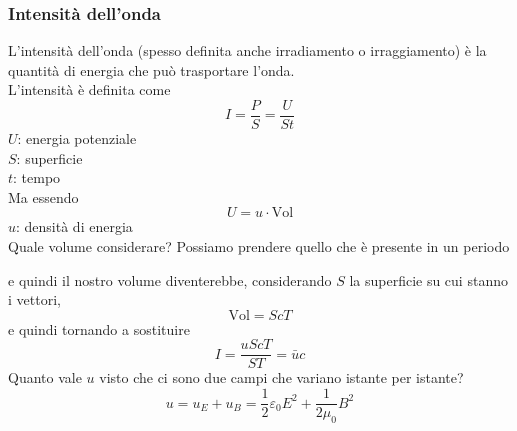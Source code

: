 \subsubsection{Intensità dell'onda}
L'intensità dell'onda (spesso definita anche irradiamento o irraggiamento) è la quantità di energia
che può trasportare l'onda.\\
L'intensità è definita come
\begin{equation*}
  I = \frac{P}{S} = \frac{U}{St}
\end{equation*}
$U$: energia potenziale\\
$S$: superficie\\
$t$: tempo\\ [\baselineskip]
Ma essendo
\begin{equation*}
  U = u\cdot\text{Vol}
\end{equation*}
$u$: densità di energia\\ [\baselineskip]
Quale volume considerare? Possiamo prendere quello che è presente in un periodo
\begin{center}
\end{center}
e quindi il nostro volume diventerebbe, considerando $S$ la superficie su cui stanno i vettori,
\begin{equation*}
  \text{Vol} = ScT
\end{equation*}
e quindi tornando a sostituire
\begin{equation*}
  I = \frac{uScT}{ST} = \bar{u}c
\end{equation*}
Quanto vale $u$ visto che ci sono due campi che variano istante per istante?
\begin{equation*}
  u = u_E + u_B = \frac{1}{2}\varepsilon_0E^2+\frac{1}{2\mu_0}B^2
\end{equation*}
